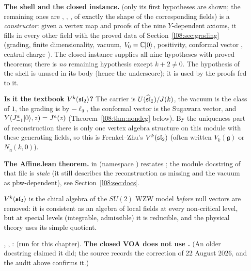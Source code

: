 \begin{dictionary}
\textbf{The shell and the closed instance.}  (only its first hypotheses are shown;
the remaining ones are , , , of exactly the shape of
the corresponding  fields) is a \emph{constructor}: given a vertex map and
proofs of the nine $Y$-dependent axioms, it fills in every other field with the proved data of
Section~\ref{l08:sec:grading} (grading, finite dimensionality, vacuum, $V_0={\mathbb{C}}|0\rangle$, positivity,
conformal vector , central charge ). The closed instance
\allowbreak{} supplies all nine hypotheses with proved theorems; there is \emph{no}
remaining hypothesis except $k+2\ne0$. The hypothesis  of the shell is unused in its body
(hence the underscore); it is used by the proofs fed to it.

\textbf{Is it the textbook $V^k(\mathfrak{sl}_2)$?} The carrier is $U(\widehat{\mathfrak{sl}}_2)/J(k)$, the vacuum is the
class of $1$, the grading is by $-\ell_0$, the conformal vector is the Sugawara vector, and
$Y(J^a_{-1}|0\rangle,z) = J^a(z)$ (Theorem~\ref{l08:thm:nondeg} below). By the uniqueness part of
reconstruction there is only one vertex algebra structure on this module with these generating
fields, so this is Frenkel--Zhu's $V^k(\mathfrak{sl}_2)$ (often written $V_k(\mathfrak g)$ or $N_{\mathfrak g}(k,0)$).

\textbf{The Affine.lean theorem.} \allowbreak{} in
 (namespace ) restates ; the module docstring of that file is \emph{stale} (it still describes the
reconstruction as missing and the vacuum as pbw-dependent), see Section~\ref{l08:sec:docs}.
\end{dictionary}

\begin{physics}
$V^k(\mathfrak{sl}_2)$ is the chiral algebra of the $SU(2)$ WZW model \emph{before} null vectors are removed:
it is consistent as an algebra of local fields at every non-critical level, but at special levels
(integrable, admissible) it is reducible, and the physical theory uses its simple quotient.
\end{physics}

\begin{status}
\allowbreak{}\allowbreak{}\allowbreak{}, \allowbreak{}\allowbreak{}\allowbreak{}\allowbreak{}\allowbreak{},
\allowbreak{}\allowbreak{}: \lean{[propext, Classical.}\allowbreak{}\allowbreak\lean{sound]} (run for this
chapter). \textbf{The closed VOA does not use .} (An older docstring claimed it did; the
source records the correction of 22 August 2026, and the audit above confirms it.)
\end{status}

